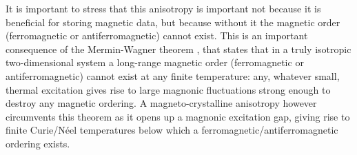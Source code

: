 It is important to stress that this anisotropy is important not because it is beneficial for storing magnetic data, but because without it the magnetic order (ferromagnetic or antiferromagnetic) cannot exist. This is an important consequence of the Mermin-Wagner theorem \cite{mermin_absence_1966}, that states that in a truly isotropic two-dimensional system a long-range magnetic order (ferromagnetic or antiferromagnetic) cannot exist at any finite temperature: any, whatever small, thermal excitation gives rise to large magnonic fluctuations strong enough to destroy any magnetic ordering. A magneto-crystalline anisotropy however circumvents this theorem as it opens up a magnonic excitation gap, giving rise to finite Curie/N\'eel temperatures below which a ferromagnetic/antiferromagnetic ordering exists. 


